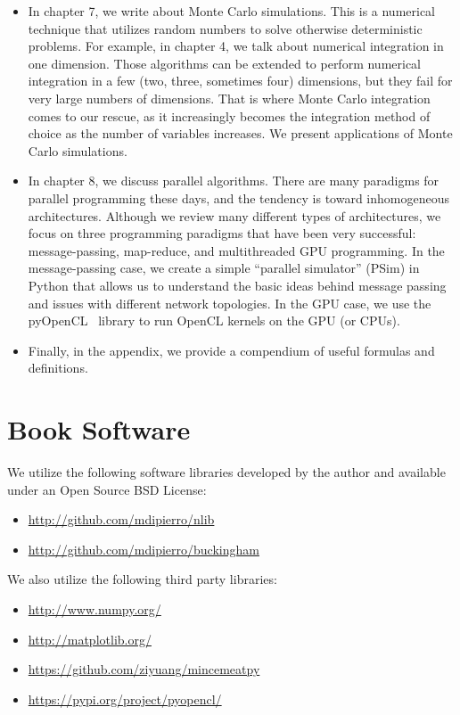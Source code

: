 \documentclass[justified, sixbynine]{tufte-book}
\theoremstyle{plain}%
\newtheorem * {corollary}{Corollary}
\theoremstyle{definition}
\theoremstyle{remark}
\newtheorem * {remark}{Remark}
\newtheorem * {note}{Note}
\begin{document}
\begin{fullwidth}
\begin{itemize}
\item In chapter 7, we write about Monte Carlo simulations. This is a numerical technique that utilizes random numbers to solve otherwise deterministic problems. For example, in chapter 4, we talk about numerical integration in one dimension. Those algorithms can be extended to perform numerical integration in a few (two, three, sometimes four) dimensions, but they fail for very large numbers of dimensions. That is where Monte Carlo integration comes to our rescue, as it increasingly becomes the integration method of choice as the number of variables increases. We present applications of Monte Carlo simulations.
\item In chapter 8, we discuss parallel algorithms. There are many paradigms for parallel programming these days, and the tendency is toward inhomogeneous architectures. Although we review many different types of architectures, we focus on three programming paradigms that have been very successful: message-passing, map-reduce, and multithreaded GPU programming. In the message-passing case, we create a simple ``parallel simulator'' (PSim) in Python that allows us to understand the basic ideas behind message passing and issues with different network topologies. In the GPU case, we use the pyOpenCL~\cite{pyopencl} library to run OpenCL kernels on the GPU (or CPUs).

\item Finally, in the appendix, we provide a compendium of useful formulas and definitions.
\end{itemize}

\section{Book Software}

We utilize the following software libraries developed by the author and available under an Open Source BSD License:

\begin{itemize}
\item \url{http://github.com/mdipierro/nlib}
\item \url{http://github.com/mdipierro/buckingham}
\end{itemize}

We also utilize the following third party libraries:

\begin{itemize}
\item \url{http://www.numpy.org/}
\item \url{http://matplotlib.org/}
\item \url{https://github.com/ziyuang/mincemeatpy}
\item \url{https://pypi.org/project/pyopencl/}
\end{itemize}


\end{fullwidth}
\end{document}
